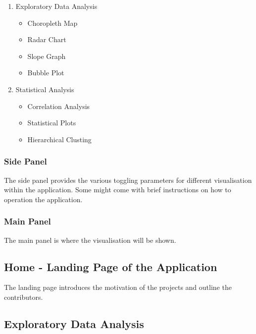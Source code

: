 \documentclass[
]{article}
\providecommand{\tightlist}{%
  \setlength{\itemsep}{0pt}\setlength{\parskip}{0pt}}
\begin{document}
\begin{enumerate}
\def\labelenumi{\arabic{enumi}.}
\item
  Exploratory Data Analysis

  \begin{itemize}
  \tightlist
  \item
    Choropleth Map
  \item
    Radar Chart
  \item
    Slope Graph
  \item
    Bubble Plot
  \end{itemize}
\item
  Statistical Analysis

  \begin{itemize}
  \tightlist
  \item
    Correlation Analysis
  \item
    Statistical Plots
  \item
    Hierarchical Clusting
  \end{itemize}
\end{enumerate}

\hypertarget{side-panel}{%
\subsubsection{Side Panel}\label{side-panel}}

The side panel provides the various toggling parameters for different
visualisation within the application. Some might come with brief
instructions on how to operation the application.

\hypertarget{main-panel}{%
\subsubsection{Main Panel}\label{main-panel}}

The main panel is where the visualisation will be shown.

\hypertarget{home---landing-page-of-the-application}{%
\subsection{Home - Landing Page of the
Application}\label{home---landing-page-of-the-application}}

The landing page introduces the motivation of the projects and outline
the contributors.

\hypertarget{exploratory-data-analysis}{%
\subsection{Exploratory Data Analysis}\label{exploratory-data-analysis}}
\end{document}
